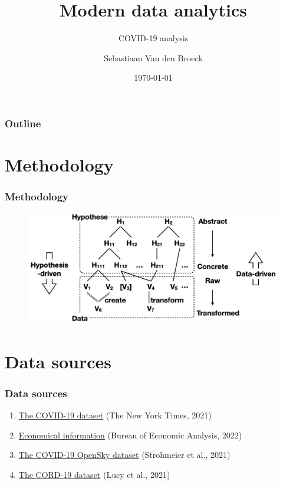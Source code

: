 \documentclass{beamer}
\title{Modern data analytics}
\subtitle{COVID-19 analysis}
\author{Sebastiaan Van den Broeck}
\institute{KUL}
\date{\today}
\begin{document}
\begin{frame}
\titlepage
\end{frame}

\begin{frame}
\frametitle{Outline}
\tableofcontents
\end{frame}

\section{Methodology}
\begin{frame}
\frametitle{Methodology}

\begin{figure}
\centering
\includegraphics[width=0.8\linewidth]{../visualizations/hypothesis_space_data_space.png}
\end{figure}

\end{frame}

\section{Data sources}
\begin{frame}
\frametitle{Data sources}

\begin{enumerate}
\item \href{https://github.com/nytimes/covid-19-data}{The COVID-19 dataset} \hfill (The New York Times, 2021)
\item \href{https://apps.bea.gov/regional/downloadzip.cfm}{Economical information} \hfill (Bureau of Economic Analysis, 2022)
\item \href{https://zenodo.org/record/6411336\#.YvUG14VBzCl}{The COVID-19 OpenSky dataset} \hfill (Strohmeier et al., 2021)
\item \href{https://github.com/allenai/cord19}{The CORD-19 dataset} \hfill (Lucy et al., 2021)
\end{enumerate}

\end{frame}
\end{document}
